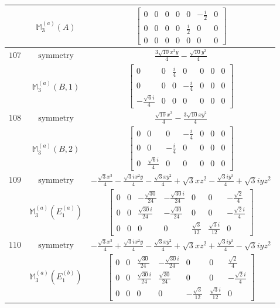 \documentclass[fleqn,8pt,landscape]{jsarticle}
\begin{document}
\begin{longtable}{ccc}
$  $ & $ \mathbb{M}_{3}^{(a)}(A) $ & $ \begin{bmatrix} 0 & 0 & 0 & 0 & 0 & - \frac{i}{2} & 0 \\ 0 & 0 & 0 & 0 & \frac{i}{2} & 0 & 0 \\ 0 & 0 & 0 & 0 & 0 & 0 & 0 \end{bmatrix} $ \\ \hline
$ 107 $ & $ \text{symmetry} $ & $ \frac{3 \sqrt{10} x^{2} y}{4} - \frac{\sqrt{10} y^{3}}{4} $ \\
$  $ & $ \mathbb{M}_{3}^{(a)}(B,1) $ & $ \begin{bmatrix} 0 & 0 & \frac{i}{4} & 0 & 0 & 0 & 0 \\ 0 & 0 & 0 & - \frac{i}{4} & 0 & 0 & 0 \\ - \frac{\sqrt{6} i}{4} & 0 & 0 & 0 & 0 & 0 & 0 \end{bmatrix} $ \\ \hline
$ 108 $ & $ \text{symmetry} $ & $ \frac{\sqrt{10} x^{3}}{4} - \frac{3 \sqrt{10} x y^{2}}{4} $ \\
$  $ & $ \mathbb{M}_{3}^{(a)}(B,2) $ & $ \begin{bmatrix} 0 & 0 & 0 & - \frac{i}{4} & 0 & 0 & 0 \\ 0 & 0 & - \frac{i}{4} & 0 & 0 & 0 & 0 \\ 0 & \frac{\sqrt{6} i}{4} & 0 & 0 & 0 & 0 & 0 \end{bmatrix} $ \\ \hline
$ 109 $ & $ \text{symmetry} $ & $ - \frac{\sqrt{3} x^{3}}{4} - \frac{\sqrt{3} i x^{2} y}{4} - \frac{\sqrt{3} x y^{2}}{4} + \sqrt{3} x z^{2} - \frac{\sqrt{3} i y^{3}}{4} + \sqrt{3} i y z^{2} $ \\
$  $ & $ \mathbb{M}_{3}^{(a)}(E_{1}^{(a)}) $ & $ \begin{bmatrix} 0 & 0 & - \frac{\sqrt{30}}{24} & - \frac{\sqrt{30} i}{24} & 0 & 0 & - \frac{\sqrt{2}}{4} \\ 0 & 0 & \frac{\sqrt{30} i}{24} & - \frac{\sqrt{30}}{24} & 0 & 0 & - \frac{\sqrt{2} i}{4} \\ 0 & 0 & 0 & 0 & \frac{\sqrt{3}}{12} & \frac{\sqrt{3} i}{12} & 0 \end{bmatrix} $ \\ \hline
$ 110 $ & $ \text{symmetry} $ & $ - \frac{\sqrt{3} x^{3}}{4} + \frac{\sqrt{3} i x^{2} y}{4} - \frac{\sqrt{3} x y^{2}}{4} + \sqrt{3} x z^{2} + \frac{\sqrt{3} i y^{3}}{4} - \sqrt{3} i y z^{2} $ \\
$  $ & $ \mathbb{M}_{3}^{(a)}(E_{1}^{(b)}) $ & $ \begin{bmatrix} 0 & 0 & \frac{\sqrt{30}}{24} & - \frac{\sqrt{30} i}{24} & 0 & 0 & \frac{\sqrt{2}}{4} \\ 0 & 0 & \frac{\sqrt{30} i}{24} & \frac{\sqrt{30}}{24} & 0 & 0 & - \frac{\sqrt{2} i}{4} \\ 0 & 0 & 0 & 0 & - \frac{\sqrt{3}}{12} & \frac{\sqrt{3} i}{12} & 0 \end{bmatrix} $ \\ \hline

\end{longtable}
\end{document}
